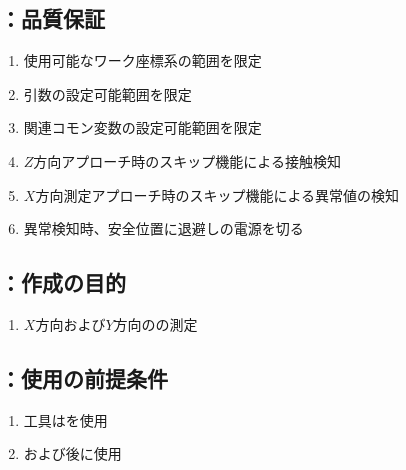 \clearpage
\subsection{\MXIface：品質保証}
\begin{enumerate}[label*=\sarrow]
\item 使用可能なワーク座標系の範囲を限定
\item {}引数の設定可能範囲を限定
\item 関連コモン変数の設定可能範囲を限定
\item $Z$方向アプローチ時のスキップ機能による接触検知
\item $X$方向測定アプローチ時のスキップ機能による異常値の検知
\item 異常検知時、安全位置に退避し\TouchSensorProbe の電源を切る
\end{enumerate}



\clearpage


\subsection{\MCenterline：作成の目的}
\begin{enumerate}[label*=\sarrow]
\item $X$方向および$Y$方向の\CenterlineEndFaceDif の測定
\end{enumerate}


\subsection{\MCenterline：使用の前提条件}
\begin{enumerate}[label*=\sarrow]
\item 工具は\TouchSensorProbe を使用
\item \TopOutcutMilling および\BottomOutcutMilling 後に使用
\end{enumerate}


